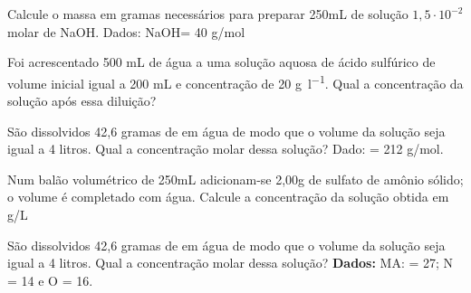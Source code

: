 \documentclass[12pt]{scrartcl}
\author{fabio}
\date{\today}
\title{}
\begin{document}
\pagebreak 

\smallbreak
\medbreak






\begin{exercise}
Calcule o massa em gramas necessários para preparar 250mL de solução \(1,5 \cdot 10^{-2}\) molar de
NaOH. Dados: NaOH= 40 g/mol
\end{exercise}




\begin{exercise}
Foi acrescentado 500 mL de água a uma solução aquosa de ácido sulfúrico de volume inicial igual a 200 mL e concentração de 20 \unit{\gram\per\litre}. Qual a concentração da solução após essa diluição?
\end{exercise}




\begin{exercise}
São dissolvidos 42,6 gramas de  em água de modo que o volume da solução seja igual a 4 litros. Qual a concentração molar dessa solução? Dado:  = 212 g/mol.
\end{exercise}



\begin{exercise}
Num balão volumétrico de 250mL adicionam-se 2,00g de sulfato de amônio sólido; o volume é completado com água. Calcule a concentração da solução obtida em g/L
\end{exercise}








\begin{exercise}
São dissolvidos 42,6 gramas de  em água de modo que o volume da solução seja igual a 4 litros. Qual a concentração molar dessa solução? \textbf{Dados:} MA: = 27; N = 14 e O = 16.
\end{exercise}
\end{document}
